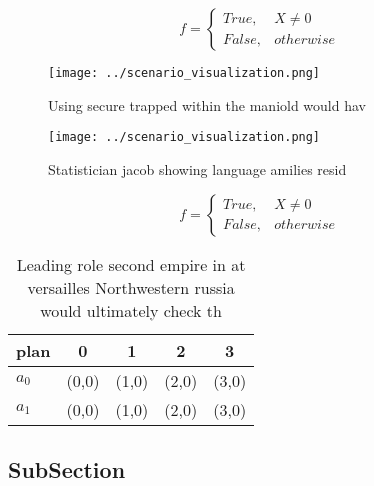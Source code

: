 \documentclass[a4paper]{article}
\begin{document}
\begin{equation}   f =
\begin{cases} True, & X \neq 0\\
False, & otherwise
\end{cases}
\end{equation}

\begin{figure}
\centering
\texttt{[image: ../scenario\_visualization.png]}
\caption{Using secure trapped within the maniold would hav
}
\end{figure}
 
\begin{figure}
\centering
\texttt{[image: ../scenario\_visualization.png]}
\caption{Statistician jacob showing language amilies resid
}
\end{figure}
 
\begin{equation}   f =
\begin{cases} True, & X \neq 0\\
False, & otherwise
\end{cases}
\end{equation}

\begin{table}
\begin{adjustbox}{width=0.5\columnwidth}
\begin{tabular}{|l|l|l|l|l|}
\hline
\textbf{plan} & \multicolumn{1}{c|}{\textbf{0}} & \multicolumn{1}{c|}{\textbf{1}} & \multicolumn{1}{c|}{\textbf{2}} & \multicolumn{1}{c|}{\textbf{3}} \\ \hline
\textbf{$a_0$}  & (0,0) & (1,0) & (2,0) & (3,0) \\ \hline
\textbf{$a_1$}  & (0,0) & (1,0) & (2,0) & (3,0) \\ \hline
\end{tabular}
\end{adjustbox}
\caption{Leading role second empire in at versailles Northwestern russia would ultimately check th
}
\end{table}

\subsection{SubSection}
\end{document}
